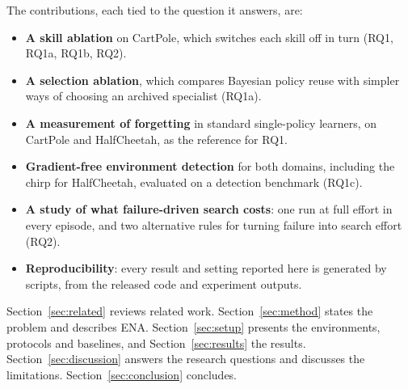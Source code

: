 The contributions, each tied to the question it answers, are:
\begin{itemize}
    \item \textbf{A skill ablation} on CartPole, which switches each skill off in turn (RQ1, RQ1a, RQ1b, RQ2).
    \item \textbf{A selection ablation}, which compares Bayesian policy reuse with simpler ways of choosing an archived specialist (RQ1a).
    \item \textbf{A measurement of forgetting} in standard single-policy learners, on CartPole and HalfCheetah, as the reference for RQ1.
    \item \textbf{Gradient-free environment detection} for both domains, including the chirp for HalfCheetah, evaluated on a detection benchmark (RQ1c).
    \item \textbf{A study of what failure-driven search costs}: one run at full effort in every episode, and two alternative rules for turning failure into search effort (RQ2).
    \item \textbf{Reproducibility}: every result and setting reported here is generated by scripts, from the released code and experiment outputs.
\end{itemize}

Section~\ref{sec:related} reviews related work. Section~\ref{sec:method} states the problem and describes ENA. Section~\ref{sec:setup} presents the environments, protocols and baselines, and Section~\ref{sec:results} the results. Section~\ref{sec:discussion} answers the research questions and discusses the limitations. Section~\ref{sec:conclusion} concludes.
